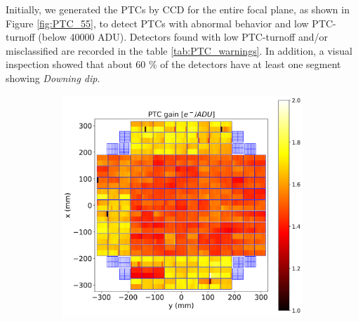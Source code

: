 
Initially, we generated the PTCs by CCD for the entire focal plane, as shown in Figure \ref{fig:PTC_55}, to detect PTCs with abnormal behavior and low PTC-turnoff (below 40000 ADU). Detectors found with low PTC-turnoff and/or misclassified are recorded in the table \ref{tab:PTC_warnings}. In addition, a visual inspection showed that about 60 \% of the detectors have at least one segment showing \textit{Downing dip}. 

\vspace{3mm}

\begin{figure}[!htb]
 \centering
     \begin{subfigure}[b]{0.49\textwidth}
         \centering
         \includegraphics[width=\textwidth]{Figures/Focal_plane_gain.png}
     \end{subfigure}
     \hfill %
     \begin{subfigure}[b]{0.49\textwidth}
         \centering

\end{subfigure}
\end{figure}

